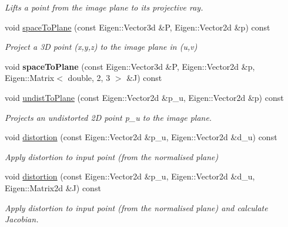 \begin{DoxyCompactItemize}
\begin{DoxyCompactList}\small\item\em Lifts a point from the image plane to its projective ray. \end{DoxyCompactList}\item 
void \hyperlink{classcamodocal_1_1CataCamera_ab705d867d93d87c85d755bb7b1022a2c}{space\+To\+Plane} (const Eigen\+::\+Vector3d \&P, Eigen\+::\+Vector2d \&p) const
\begin{DoxyCompactList}\small\item\em Project a 3D point ({\itshape x},{\itshape y},{\itshape z}) to the image plane in ({\itshape u},{\itshape v}) \end{DoxyCompactList}\item 
\mbox{\label{classcamodocal_1_1CataCamera_ad368a23e9e1b2e2a1202a021703861c8}} 
void {\bfseries space\+To\+Plane} (const Eigen\+::\+Vector3d \&P, Eigen\+::\+Vector2d \&p, Eigen\+::\+Matrix$<$ double, 2, 3 $>$ \&J) const
\item 
void \hyperlink{classcamodocal_1_1CataCamera_a9184557401622acaf2a00fd9b1295d13}{undist\+To\+Plane} (const Eigen\+::\+Vector2d \&p\+\_\+u, Eigen\+::\+Vector2d \&p) const
\begin{DoxyCompactList}\small\item\em Projects an undistorted 2D point p\+\_\+u to the image plane. \end{DoxyCompactList}\item 
void \hyperlink{classcamodocal_1_1CataCamera_ade73e1a665f97d5a95d09f0fff19a3f7}{distortion} (const Eigen\+::\+Vector2d \&p\+\_\+u, Eigen\+::\+Vector2d \&d\+\_\+u) const
\begin{DoxyCompactList}\small\item\em Apply distortion to input point (from the normalised plane) \end{DoxyCompactList}\item 
void \hyperlink{classcamodocal_1_1CataCamera_af9f94a9e9109ad71fcabb0f7bc77a18f}{distortion} (const Eigen\+::\+Vector2d \&p\+\_\+u, Eigen\+::\+Vector2d \&d\+\_\+u, Eigen\+::\+Matrix2d \&J) const
\begin{DoxyCompactList}\small\item\em Apply distortion to input point (from the normalised plane) and calculate Jacobian. \end{DoxyCompactList}\item 
\mbox{\label{classcamodocal_1_1CataCamera_a0ffe9fca3e985252da979c4bad701d70}} 

\end{DoxyCompactItemize}
